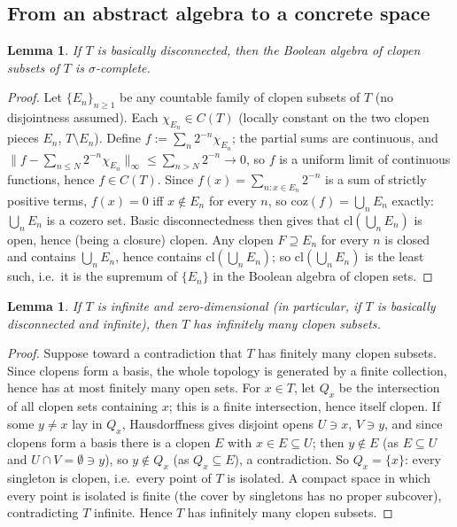 \documentclass{amsart}
\newtheorem{lemma}[theorem]{Lemma}
\theoremstyle{definition}
\theoremstyle{remark}
\newcommand{\cont}[1]{C\left(#1\right)}
\begin{document}
\subsection{From an abstract algebra to a concrete space}

\begin{lemma}\label{lem:clopen-sigma-complete}
If $T$ is basically disconnected, then the Boolean algebra of clopen
subsets of $T$ is $\sigma$-complete.
\end{lemma}

\begin{proof}
Let $\{E_n\}_{n\geq1}$ be any countable family of clopen subsets of $T$
(no disjointness assumed). Each $\chi_{E_n}\in\cont{T}$ (locally
constant on the two clopen pieces $E_n$, $T\setminus E_n$). Define
$f:=\sum_n2^{-n}\chi_{E_n}$; the partial sums are continuous, and
$\|f-\sum_{n\leq N}2^{-n}\chi_{E_n}\|_\infty\leq\sum_{n>N}2^{-n}\to0$, so
$f$ is a uniform limit of continuous functions, hence $f\in\cont{T}$.
Since $f(x)=\sum_{n:x\in E_n}2^{-n}$ is a sum of strictly positive terms,
$f(x)=0$ iff $x\notin E_n$ for every $n$, so $\mathrm{coz}(f)=\bigcup_nE_n$
exactly: $\bigcup_nE_n$ is a cozero set. Basic disconnectedness then gives
that $\mathrm{cl}(\bigcup_nE_n)$ is open, hence (being a closure) clopen.
Any clopen $F\supseteq E_n$ for every $n$ is closed and contains
$\bigcup_nE_n$, hence contains $\mathrm{cl}(\bigcup_nE_n)$; so
$\mathrm{cl}(\bigcup_nE_n)$ is the least such, i.e.\ it is the supremum of
$\{E_n\}$ in the Boolean algebra of clopen sets.
\end{proof}

\begin{lemma}\label{lem:clopen-infinite}
If $T$ is infinite and zero-dimensional (in particular, if $T$ is
basically disconnected and infinite), then $T$ has infinitely many
clopen subsets.
\end{lemma}

\begin{proof}
Suppose toward a contradiction that $T$ has finitely many clopen
subsets. Since clopens form a basis, the whole topology is generated by
a finite collection, hence has at most finitely many open sets. For
$x\in T$, let $Q_x$ be the intersection of all clopen sets containing
$x$; this is a finite intersection, hence itself clopen. If some $y\neq
x$ lay in $Q_x$, Hausdorffness gives disjoint opens $U\ni x$, $V\ni y$,
and since clopens form a basis there is a clopen $E$ with $x\in
E\subseteq U$; then $y\notin E$ (as $E\subseteq U$ and $U\cap
V=\emptyset\ni y$), so $y\notin Q_x$ (as $Q_x\subseteq E$), a
contradiction. So $Q_x=\{x\}$: every singleton is clopen, i.e.\ every
point of $T$ is isolated. A compact space in which every point is
isolated is finite (the cover by singletons has no proper subcover),
contradicting $T$ infinite. Hence $T$ has infinitely many clopen
subsets.
\end{proof}
\end{document}
